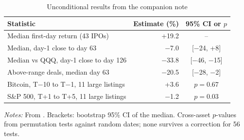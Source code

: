 \begin{table}[!htbp]\centering\footnotesize
\caption{Unconditional results from the companion note}\label{tab:recap}

\begin{threeparttable}
\begin{tabular}{lrc}
\toprule
Statistic & Estimate (\%) & 95\% CI or $p$ \\
\midrule
Median first-day return (43 IPOs) & +19.2 & -- \\
Median, day-1 close to day 63 & $-$7.0 & [$-$24, +8] \\
Median vs QQQ, day-1 close to day 126 & $-$33.8 & [$-$46, $-$15] \\
Above-range deals, median day 63 & $-$20.5 & [$-$28, $-$2] \\
Bitcoin, T$-$10 to T$-$1, 11 large listings & +3.6 & $p=0.67$ \\
S\&P 500, T+1 to T+5, 11 large listings & $-$1.2 & $p=0.03$ \\
\bottomrule
\end{tabular}
\begin{tablenotes}[flushleft]\footnotesize
\item \textit{Notes:} From \citet{frenzyfade2026}. Brackets: bootstrap 95\% CI of the median. Cross-asset $p$-values from permutation tests against random dates; none survives a correction for 56 tests.
\end{tablenotes}
\end{threeparttable}

\end{table}
